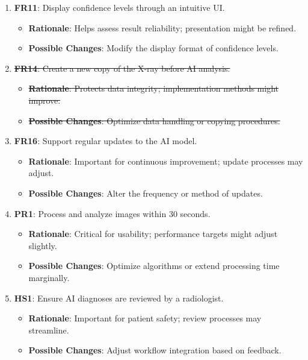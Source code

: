 \documentclass[12pt]{article}
\begin{document}
\begin{enumerate}[resume]
    \item \textbf{FR11}: Display confidence levels through an intuitive UI.
    \begin{itemize}[label=-]
        \item \textbf{Rationale}: Helps assess result reliability; presentation might be refined.
        \item \textbf{Possible Changes}: Modify the display format of confidence levels.
    \end{itemize}

    \item \sout{\textbf{FR14}: Create a new copy of the X-ray before AI analysis.}
    \begin{itemize}[label=-]
        \item \sout{\textbf{Rationale}: Protects data integrity; implementation methods might improve.}
        \item \sout{\textbf{Possible Changes}: Optimize data handling or copying procedures.}
    \end{itemize}

    \item \textbf{FR16}: Support regular updates to the AI model.
    \begin{itemize}[label=-]
        \item \textbf{Rationale}: Important for continuous improvement; update processes may adjust.
        \item \textbf{Possible Changes}: Alter the frequency or method of updates.
    \end{itemize}

    \item \textbf{PR1}: Process and analyze images within 30 seconds.
    \begin{itemize}[label=-]
        \item \textbf{Rationale}: Critical for usability; performance targets might adjust slightly.
        \item \textbf{Possible Changes}: Optimize algorithms or extend processing time marginally.
    \end{itemize}

    \item \textbf{HS1}: Ensure AI diagnoses are reviewed by a radiologist.
    \begin{itemize}[label=-]
        \item \textbf{Rationale}: Important for patient safety; review processes may streamline.
        \item \textbf{Possible Changes}: Adjust workflow integration based on feedback.
    \end{itemize}


\end{enumerate}
\end{document}
